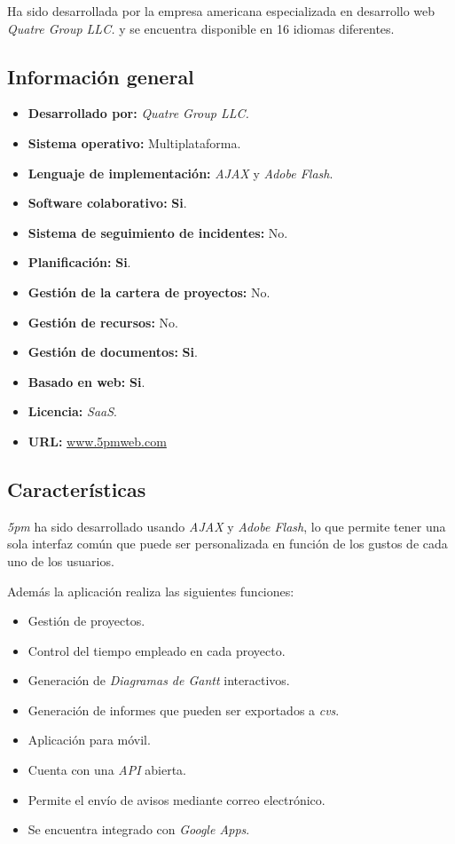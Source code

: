 \documentclass[11pt,a4paper,spanish,twoside]{report}
\begin{document}
Ha sido desarrollada por la empresa americana especializada en desarrollo web
\emph{Quatre Group LLC.} \cite{5PM} y se encuentra disponible en 16 idiomas
diferentes.

  \subsection{Información general}
    \begin{itemize}
        \item\textbf{Desarrollado por:} \emph{Quatre Group LLC.}
	\item\textbf{Sistema operativo:} Multiplataforma. 
	\item\textbf{Lenguaje de implementación:} \emph{AJAX} y \emph{Adobe Flash}.
        \item\textbf{Software colaborativo:} \textbf{Si}. 
        \item\textbf{Sistema de seguimiento de incidentes:} No. 
	\item\textbf{Planificación:} \textbf{Si}.
	\item\textbf{Gestión de la cartera de proyectos:} No.
	\item\textbf{Gestión de recursos:} No.
	\item\textbf{Gestión de documentos:} \textbf{Si}.
        \item\textbf{Basado en web:} \textbf{Si}.
	\item\textbf{Licencia:} \emph{SaaS}.
	\item\textbf{URL:} \url{www.5pmweb.com}
        \end{itemize}

	\subsection{Características}
        
        \emph{5pm} ha sido desarrollado usando \emph{AJAX} y \emph{Adobe
          Flash}, lo que permite tener una sola interfaz común que puede ser
        personalizada en función de los gustos de cada uno de los usuarios.

        Además la aplicación realiza las siguientes funciones:
        \begin{itemize}
          \item Gestión de proyectos.
          \item Control del tiempo empleado en cada proyecto.
          \item Generación de \emph {Diagramas de Gantt} interactivos.
          \item Generación de informes que pueden ser exportados a
            \emph{cvs}.
          \item Aplicación para móvil.
          \item Cuenta con una \emph{API} abierta.
          \item Permite el envío de avisos mediante correo electrónico.
          \item Se encuentra integrado con \emph{Google Apps}.
        \end{itemize}
        
\end{document}
